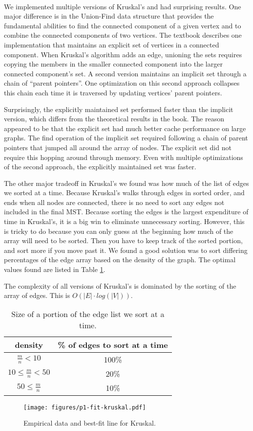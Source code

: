 \paragraph{}
We implemented multiple versions of Kruskal's and had surprising
results. One major difference is in the Union-Find data structure that
provides the fundamental abilities to find the connected component of a
given vertex and to combine the connected components of two vertices. The
textbook describes one implementation that maintains an explicit set of
vertices in a connected component. When Kruskal's algorithm adds an edge,
unioning the sets requires copying the members in the smaller connected
component into the larger connected component's set. A second version
maintains an implicit set through a chain of ``parent
pointers''. One optimization on this second approach collapses this chain
each time it is traversed by updating vertices' parent pointers.

Surprisingly, the explicitly maintained set performed faster than the
implicit version, which differs from the theoretical results in the
book. The reason appeared to
be that the explicit set had much better cache performance on large
graphs. The find operation of the
implicit set required following a chain of parent pointers that jumped
all around the array of nodes. The explicit set did not require this
hopping around through memory. Even with multiple optimizations of the
second approach, the explicitly maintained set was faster.

The other major tradeoff in Kruskal's we found was how much of the list of
edges we sorted at a time. Because Kruskal's walks through edges in sorted
order, and ends when all nodes are connected, there is no need to sort any
edges not included in the final MST. Because sorting the edges is the
largest expenditure of time in Kruskal's, it is a big win to eliminate
unnecessary sorting. However, this is tricky to do because you can only
guess at the beginning how much of the array will need to be sorted. Then
you have to keep track of the sorted portion, and sort more if you move
past it. We found a good solution was to sort differing percentages of the
edge array based on the density of the graph. The optimal values found are
listed in Table \ref{table:kruskal-sort-percent}.

The complexity of all versions of Kruskal's is dominated by the sorting of
the array of edges. This is $O(|E| \cdot log(|V|))$.

\begin{table}
\begin{tabular}{|c|c|}
\hline
density&\% of edges to sort at a time\\
\hline
$\frac{m}{n} < 10$& 100\% \\
$10 \leq \frac{m}{n} < 50$& 20\% \\
$50 \leq \frac{m}{n}$& 10\% \\
\hline
\end{tabular}
\caption{Size of a portion of the edge list we sort at a time.}
\label{table:kruskal-sort-percent}
\end{table}

\begin{figure}[htb]
\centering
\texttt{[image: figures/p1-fit-kruskal.pdf]}
\caption{Empirical data and best-fit line for Kruskal.}
\label{fig:p1-fit-kruskal}
\end{figure}
